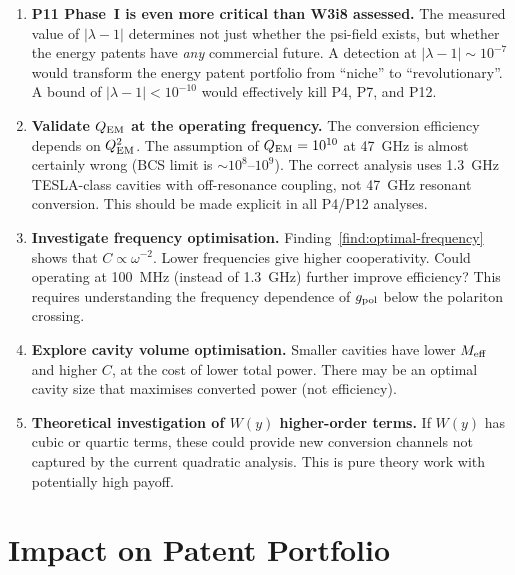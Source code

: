 \documentclass[11pt]{article}
\newcommand{\Meff}{M_{\rm eff}}
\newcommand{\lambdaone}{|\lambda{-}1|}
\newcommand{\QEM}{Q_{\rm EM}}
\begin{document}
\begin{enumerate}
\item \textbf{P11 Phase~I is even more critical than W3i8 assessed.}
  The measured value of $\lambdaone$ determines not just whether the
  psi-field exists, but whether the energy patents have \emph{any}
  commercial future. A detection at $\lambdaone \sim 10^{-7}$ would
  transform the energy patent portfolio from ``niche'' to
  ``revolutionary''. A bound of $\lambdaone < 10^{-10}$ would
  effectively kill P4, P7, and P12.

\item \textbf{Validate $\QEM$ at the operating frequency.} The
  conversion efficiency depends on $\QEM^2$. The assumption of
  $\QEM = 10^{10}$ at 47~GHz is almost certainly wrong (BCS limit is
  $\sim 10^{8}$--$10^{9}$). The correct analysis uses 1.3~GHz
  TESLA-class cavities with off-resonance coupling, not 47~GHz
  resonant conversion. This should be made explicit in all P4/P12
  analyses.

\item \textbf{Investigate frequency optimisation.} Finding~\ref{find:optimal-frequency}
  shows that $C \propto \omega^{-2}$. Lower frequencies give higher
  cooperativity. Could operating at 100~MHz (instead of 1.3~GHz)
  further improve efficiency? This requires understanding the
  frequency dependence of $g_{\rm pol}$ below the polariton crossing.

\item \textbf{Explore cavity volume optimisation.} Smaller cavities
  have lower $\Meff$ and higher $C$, at the cost of lower total power.
  There may be an optimal cavity size that maximises converted power
  (not efficiency).

\item \textbf{Theoretical investigation of $W(y)$ higher-order terms.}
  If $W(y)$ has cubic or quartic terms, these could provide new
  conversion channels not captured by the current quadratic analysis.
  This is pure theory work with potentially high payoff.
\end{enumerate}

\section{Impact on Patent Portfolio}
\label{sec:impact}
\end{document}
